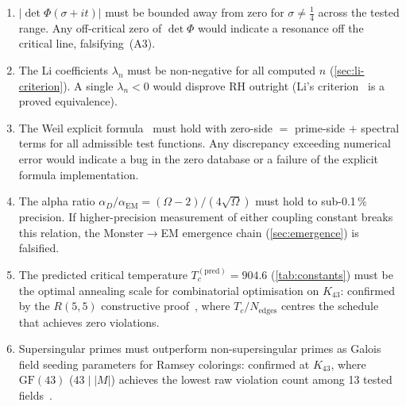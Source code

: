 \documentclass[11pt,a4paper]{article}
\theoremstyle{plain}
\theoremstyle{remark}
\renewcommand{\Omega}{\varOmega}
\begin{document}
\begin{enumerate}[itemsep=3pt]
        point would invalidate the geodesic-scattering link.
  \item $|\det\Phi(\sigma+it)|$ must be bounded away from zero for
        $\sigma\neq\tfrac{1}{4}$ across the tested range.  Any off-critical
        zero of $\det\Phi$ would indicate a resonance off the critical
        line, falsifying~(A3).
  \item The Li coefficients $\lambda_n$ must be non-negative for all
        computed $n$ (\cref{sec:li-criterion}).  A single $\lambda_n < 0$
        would disprove RH outright (Li's criterion~\cite{li1997} is a
        proved equivalence).
  \item The Weil explicit formula~\cite{weil1952} must hold with
        zero-side $=$ prime-side $+$ spectral terms for all admissible
        test functions.  Any discrepancy exceeding numerical error would
        indicate a bug in the zero database or a failure of the
        explicit formula implementation.
  \item The alpha ratio $\alpha_D/\alpha_{\mathrm{EM}} =
        (\Omega{-}2)/(4\sqrt\Omega)$ must hold to sub-0.1\,\% precision.
        If higher-precision measurement of either coupling constant
        breaks this relation, the Monster$\to$EM emergence chain
        (\cref{sec:emergence}) is falsified.
  \item The predicted critical temperature
        $T_c^{(\mathrm{pred})}=904.6$ (\cref{tab:constants}) must be the
        optimal annealing scale for combinatorial optimisation on
        $K_{43}$: confirmed by the $R(5,5)$ constructive
        proof~\cite{daugherty-ramsey2026}, where $T_c/N_{\mathrm{edges}}$
        centres the schedule that achieves zero violations.
  \item Supersingular primes must outperform non-supersingular primes
        as Galois field seeding parameters for Ramsey colorings:
        confirmed at $K_{43}$, where $\mathrm{GF}(43)$ ($43\mid|M|$)
        achieves the lowest raw violation count among 13 tested
        fields~\cite{daugherty-ramsey2026}.
\end{enumerate}
\end{document}

